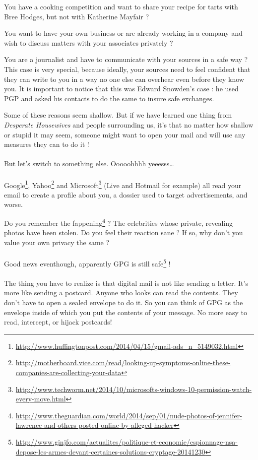 You have a cooking competition and want to share your recipe for tarts with Bree Hodges, but not with Katherine Mayfair ?

You want to have your own business or are already working in a company and wish to discuss matters with your associates privately ?

You are a journalist and have to communicate with your sources in a safe way ? This case is very special, because ideally, your sources need to
feel confident that they can write to you in a way no one else can overhear even before they know you. It is important to notice that this
was Edward Snowden's case : he used PGP and asked his contacts to do the same to insure safe exchanges.

Some of these reasons seem shallow. But if we have learned one thing from \emph{Desperate Housewives} and people surrounding us, it's that no
matter how shallow or stupid it may seem, someone might want to open your mail and will use any measures they can to do it !\\
\\
But let's switch to something else. Ooooohhhh yeeesss\ldots{}\\
\\
Google\footnote{\url{http://www.huffingtonpost.com/2014/04/15/gmail-ads_n_5149032.html}}, Yahoo\footnote{\url{http://motherboard.vice.com/read/looking-up-symptoms-online-these-companies-are-collecting-your-data}} 
and Microsoft\footnote{\url{http://www.techworm.net/2014/10/microsofts-windows-10-permission-watch-every-move.html}} (Live and Hotmail for example) all read your email to create a profile about you, a dossier used to target advertisements, and worse.

Do you remember the fappening\footnote{\url{http://www.theguardian.com/world/2014/sep/01/nude-photos-of-jennifer-lawrence-and-others-posted-online-by-alleged-hacker}} ? The celebrities whose private, revealing photos have been stolen. Do you feel their reaction sane ? If so, why don't you value your own privacy the same ?\\
\\
Good news eventhough, apparently GPG is still safe\footnote{\url{http://www.ginjfo.com/actualites/politique-et-economie/espionnage-nsa-depose-les-armes-devant-certaines-solutions-cryptage-20141230}} !\\
\\
The thing you have to realize is that digital mail is not like sending a letter. It's more like sending a postcard. Anyone who looks can read
the contents. They don't have to open a sealed envelope to do it. So you can think of GPG as the envelope inside of which you put the
contents of your message. No more easy to read, intercept, or hijack postcards!

